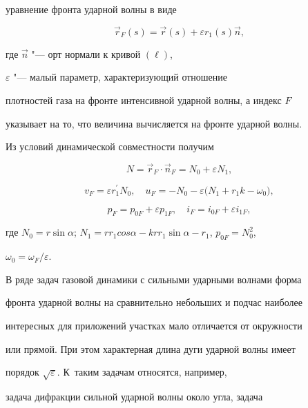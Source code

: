 уравнение фронта ударной волны в виде


\[


\vec{r}_{F}(s) = \vec{r}(s) + \varepsilon


r_1(s) \vec{n},


\]


где $\vec{n}$ "--- орт нормали к кривой $(\ell)$,


$\varepsilon$ "--- малый параметр,  характеризующий отношение


плотностей газа на фронте интенсивной ударной волны,  а индекс $F$


указывает на то,  что величина вычисляется на фронте ударной волны.





Из условий динамической совместности получим


\[


N = \vec{r}_{F}\cdot\vec{n}_{F}=


 N_0 +\varepsilon N_1,


\]


\[


v_F = \varepsilon r_1^\prime N_0,  \quad


u_F = - N_0 - \varepsilon \bigl(N_1 + r_1 k - \omega_0


\bigr),


\]


\[


p_F = p_{0F} + \varepsilon p_{1F},  \quad


i_F = i_{0F} + \varepsilon i_{1F},


\]


где  $  N_0 = r \sin\alpha$; $  N_1 = r r_1  cos


\alpha - k r r_1 \sin\alpha - r_1$,    $p_{0F} = N_0^2$,


 $\omega_0 = \omega_F/\varepsilon$.





В ряде задач газовой динамики с сильными ударными волнами форма


фронта ударной волны на сравнительно небольших и подчас наиболее


интересных для приложений участках мало отличается от окружности


или прямой. При этом характерная длина дуги ударной волны имеет


порядок $\sqrt\varepsilon$. К~таким задачам относятся,  например,


задача дифракции сильной ударной волны около угла,  задача


